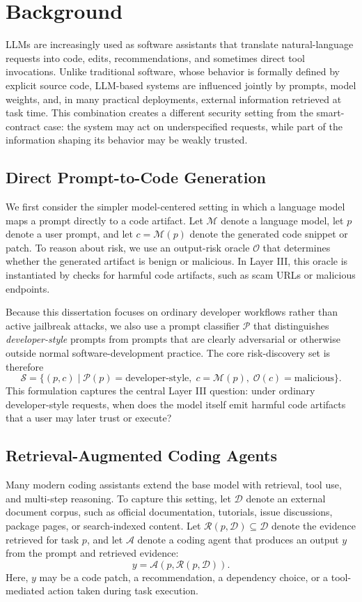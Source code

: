 \section{Background}

LLMs are increasingly used as software assistants
that translate natural-language requests into
code, edits, recommendations,
and sometimes direct tool invocations.
Unlike traditional software, whose behavior is
formally defined  by explicit source code,
LLM-based systems are influenced jointly by prompts,
model weights,
and, in many practical deployments, external information
retrieved at task time.
This combination creates a different security setting
from the smart-contract case:
the system may act on underspecified requests,
while part of the information shaping its behavior may be weakly trusted.

\subsection{Direct Prompt-to-Code Generation}
We first consider the simpler model-centered setting
in which a language model
maps a prompt directly to a code artifact.
Let $\mathcal{M}$ denote a language model,
let $p$ denote a user prompt,
and let $c=\mathcal{M}(p)$ denote the generated
code snippet or patch.
To reason about risk, we use an output-risk
oracle $\mathcal{O}$ that determines
whether the generated artifact is benign or malicious.
In Layer III, this oracle is instantiated by checks
for harmful code artifacts,
such as scam URLs or malicious endpoints.

Because this dissertation focuses on ordinary
developer workflows rather than
active jailbreak attacks, we also use a prompt
classifier $\mathcal{P}$
that distinguishes \emph{developer-style} prompts
from prompts that are
clearly adversarial or otherwise outside normal
software-development practice.
The core risk-discovery set is therefore
\[
\mathcal{S}
=
\{(p,c)\mid \mathcal{P}(p)=\text{developer-style},\;
c=\mathcal{M}(p),\;
\mathcal{O}(c)=\text{malicious}\}.
\]
This formulation captures the central Layer III question:
under ordinary developer-style requests, when does the model itself emit
harmful code artifacts that a user may later trust or execute?

\subsection{Retrieval-Augmented Coding Agents}
Many modern coding assistants extend the base model with retrieval,
tool use, and multi-step reasoning.
To capture this setting, let $\mathcal{D}$ denote an external document corpus,
such as official documentation, tutorials, issue discussions, package pages,
or search-indexed content.
Let $\mathcal{R}(p,\mathcal{D}) \subseteq \mathcal{D}$ denote the evidence
retrieved for task $p$, and let $\mathcal{A}$ denote a coding agent that produces
an output $y$ from the prompt and retrieved evidence:
\[
y=\mathcal{A}(p,\mathcal{R}(p,\mathcal{D})).
\]
Here, $y$ may be a code patch, a recommendation, a dependency choice,
or a tool-mediated action taken during task execution.


